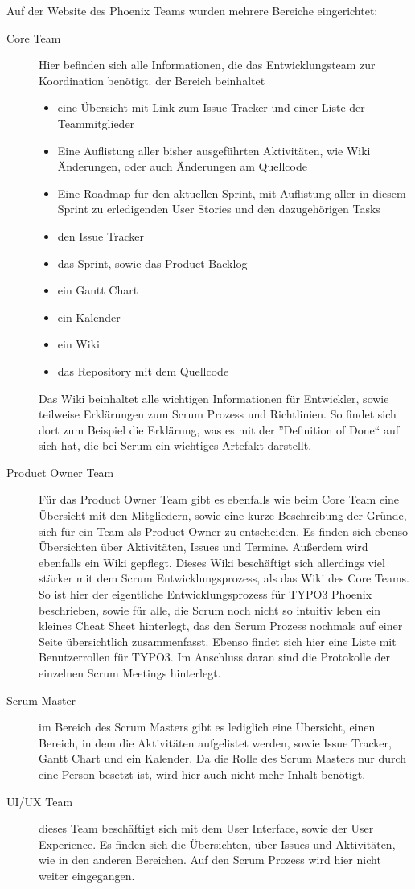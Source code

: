 Auf der Website des Phoenix Teams wurden mehrere Bereiche eingerichtet:
\begin{description}

\item [Core Team] Hier befinden sich alle Informationen, die das Entwicklungsteam zur Koordination benötigt. der Bereich beinhaltet
\begin{itemize}
\item eine Übersicht mit Link zum Issue-Tracker und einer Liste der Teammitglieder
\item Eine Auflistung aller bisher ausgeführten Aktivitäten, wie Wiki Änderungen, oder auch Änderungen am Quellcode
\item Eine Roadmap für den aktuellen Sprint, mit Auflistung aller in diesem Sprint zu erledigenden User Stories und den dazugehörigen Tasks
\item den Issue Tracker
\item das Sprint, sowie das Product Backlog
\item ein Gantt Chart
\item ein Kalender
\item  ein Wiki
\item das Repository mit dem Quellcode
\end{itemize}

Das Wiki beinhaltet alle wichtigen Informationen für Entwickler, sowie teilweise Erklärungen zum Scrum Prozess und Richtlinien.  So findet sich dort zum Beispiel die Erklärung, was es mit der ''Definition of Done``  auf sich hat, die bei Scrum ein wichtiges Artefakt darstellt.

\item [Product Owner Team] Für das Product Owner Team gibt es ebenfalls wie beim Core Team eine Übersicht mit den Mitgliedern, sowie eine kurze Beschreibung der Gründe, sich für ein Team als Product Owner zu entscheiden. Es finden sich ebenso Übersichten über Aktivitäten, Issues und Termine. Außerdem wird ebenfalls ein Wiki gepflegt. Dieses Wiki beschäftigt sich   allerdings viel stärker mit dem Scrum Entwicklungsprozess, als das Wiki des Core Teams. So ist hier der eigentliche Entwicklungsprozess für TYPO3 Phoenix beschrieben, sowie für alle, die Scrum noch nicht so intuitiv leben ein kleines Cheat Sheet hinterlegt, das den Scrum Prozess nochmals auf einer Seite übersichtlich zusammenfasst. Ebenso findet sich hier eine Liste mit Benutzerrollen für TYPO3. Im Anschluss daran sind die Protokolle der einzelnen Scrum Meetings hinterlegt.

\item [Scrum Master] im Bereich des Scrum Masters gibt es lediglich eine Übersicht, einen Bereich, in dem die Aktivitäten aufgelistet werden, sowie Issue Tracker, Gantt Chart und ein Kalender. Da die Rolle des Scrum Masters nur durch eine Person besetzt ist, wird hier auch nicht mehr Inhalt benötigt.

\item [UI/UX Team] dieses Team beschäftigt sich mit dem User Interface, sowie der User Experience. Es finden sich die Übersichten, über Issues und Aktivitäten, wie in den anderen Bereichen. Auf den Scrum Prozess wird hier nicht weiter eingegangen. \cite{bib:forge}
\end{description}


